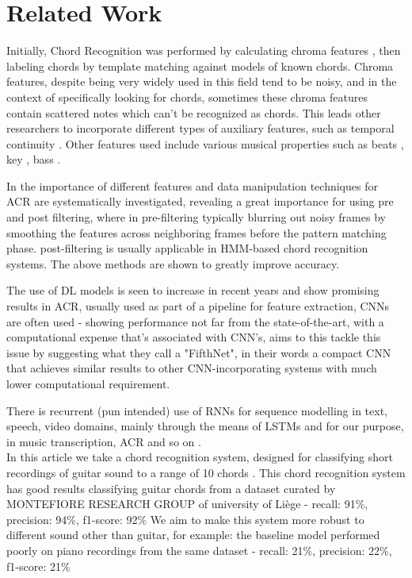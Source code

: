 \documentclass[a4paper]{article}
\begin{document}
\section{Related Work} \label{sec:related_work}
Initially, Chord Recognition was performed by calculating chroma features \citep{1999}, then labeling chords by template matching against models of known chords.
Chroma features, despite being very widely used in this field tend to be noisy, and in the context of specifically looking for chords, sometimes these chroma features contain scattered notes which can't be recognized as chords.
This leads other researchers to incorporate different types of auxiliary features, such as temporal continuity \cite{temp1, temp2}.
Other features used include various musical properties such as beats \cite{temp2, beat1}, key \cite{key1}, bass \cite{bass1}.

In \cite{featcompare} the importance of different features and data manipulation techniques for ACR are systematically investigated, revealing a great importance for using pre and post filtering, where in pre-filtering typically blurring out noisy frames by smoothing the features across neighboring frames before the pattern matching phase. post-filtering is usually applicable in HMM-based chord recognition systems. The above methods are shown to greatly improve accuracy.

The use of DL models is seen to increase in recent years and show promising results in ACR, usually used as part of a pipeline for feature extraction, CNNs are often used \cite{cnn2012, cnn2016} - showing performance not far from the state-of-the-art, with a computational expense that's associated with CNN's, \cite{cnn2021} aims to this tackle this issue by suggesting what they call a "FifthNet", in their words a compact CNN that achieves similar results to other CNN-incorporating systems with much lower computational requirement.

There is recurrent (pun intended) use of RNNs for sequence modelling in text, speech, video domains, mainly through the means of LSTMs and for our purpose, in music transcription, ACR and so on \cite{rnn2013, lstm2017}.
\\
In this article we take a chord recognition system, designed for classifying short recordings of guitar sound to a range of 10 chords \cite{baseline}. This chord recognition system has good results classifying guitar chords from a dataset curated by MONTEFIORE RESEARCH GROUP of university of Liège - recall: 91\%, precision: 94\%, f1-score: 92\%
We aim to make this system more robust to different sound other than guitar, for example: the baseline model performed poorly on piano recordings from the same dataset - recall: 21\%, precision: 22\%, f1-score: 21\%
\end{document}
